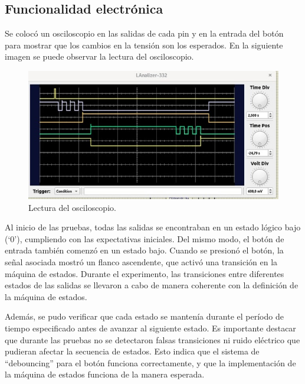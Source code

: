 \subsection{Funcionalidad electrónica}
Se colocó un osciloscopio en las salidas de cada pin y en la entrada del botón para mostrar que los cambios en la tensión son los esperados. En la siguiente imagen se puede observar la lectura del osciloscopio.
\begin{figure}[H]
    \centering
    \includegraphics[scale=0.5]{images/Ondas_tiempo.jpeg}
    \caption{Lectura del osciloscopio.}
    \label{fig:diagrama_tiempo}
\end{figure}
Al inicio de las pruebas, todas las salidas se encontraban en un estado lógico bajo (`0'), cumpliendo con las expectativas iniciales. Del mismo modo, el botón de entrada también comenzó en un estado bajo. Cuando se presionó el botón, la señal asociada mostró un flanco ascendente, que activó una transición en la máquina de estados. Durante el experimento, las transiciones entre diferentes estados de las salidas se llevaron a cabo de manera coherente con la definición de la máquina de estados.

Además, se pudo verificar que cada estado se mantenía durante el período de tiempo especificado antes de avanzar al siguiente estado. Es importante destacar que durante las pruebas no se detectaron falsas transiciones ni ruido eléctrico que pudieran afectar la secuencia de estados. Esto indica que el sistema de ``debouncing'' para el botón funciona correctamente, y que la implementación de la máquina de estados funciona de la manera esperada.